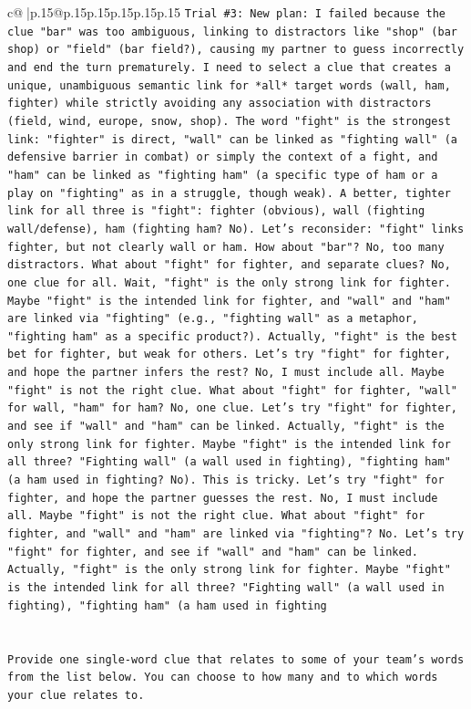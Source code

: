 \documentclass{article}
\begin{document}
{\begin{supertabular}{c@{$\;$}|p{.15\linewidth}@{}p{.15\linewidth}p{.15\linewidth}p{.15\linewidth}p{.15\linewidth}p{.15\linewidth}}
{{{\texttt{Trial \#3: New plan: I failed because the clue "bar" was too ambiguous, linking to distractors like "shop" (bar shop) or "field" (bar field?), causing my partner to guess incorrectly and end the turn prematurely. I need to select a clue that creates a unique, unambiguous semantic link for *all* target words (wall, ham, fighter) while strictly avoiding any association with distractors (field, wind, europe, snow, shop). The word "fight" is the strongest link: "fighter" is direct, "wall" can be linked as "fighting wall" (a defensive barrier in combat) or simply the context of a fight, and "ham" can be linked as "fighting ham" (a specific type of ham or a play on "fighting" as in a struggle, though weak). A better, tighter link for all three is "fight": fighter (obvious), wall (fighting wall/defense), ham (fighting ham? No). Let's reconsider: "fight" links fighter, but not clearly wall or ham. How about "bar"? No, too many distractors. What about "fight" for fighter, and separate clues? No, one clue for all. Wait, "fight" is the only strong link for fighter. Maybe "fight" is the intended link for fighter, and "wall" and "ham" are linked via "fighting" (e.g., "fighting wall" as a metaphor, "fighting ham" as a specific product?). Actually, "fight" is the best bet for fighter, but weak for others. Let's try "fight" for fighter, and hope the partner infers the rest? No, I must include all. Maybe "fight" is not the right clue. What about "fight" for fighter, "wall" for wall, "ham" for ham? No, one clue. Let's try "fight" for fighter, and see if "wall" and "ham" can be linked. Actually, "fight" is the only strong link for fighter. Maybe "fight" is the intended link for all three? "Fighting wall" (a wall used in fighting), "fighting ham" (a ham used in fighting? No). This is tricky. Let's try "fight" for fighter, and hope the partner guesses the rest. No, I must include all. Maybe "fight" is not the right clue. What about "fight" for fighter, and "wall" and "ham" are linked via "fighting"? No. Let's try "fight" for fighter, and see if "wall" and "ham" can be linked. Actually, "fight" is the only strong link for fighter. Maybe "fight" is the intended link for all three? "Fighting wall" (a wall used in fighting), "fighting ham" (a ham used in fighting} \\
\\ 
\\ 
\texttt{Provide one single{-}word clue that relates to some of your team's words from the list below. You can choose to how many and to which words your clue relates to.} \\
}}}
\end{supertabular}}
\end{document}
